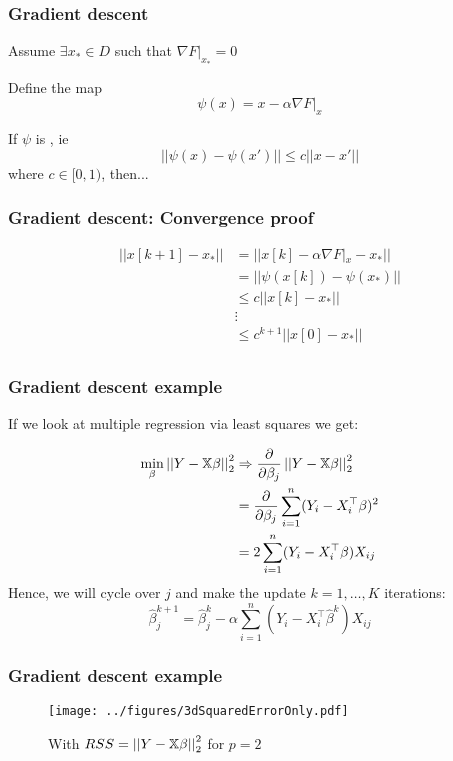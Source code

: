 \documentclass{beamer}
\begin{document}
\begin{frame}
\frametitle{Gradient descent}
Assume $\exists x_* \in D$ such that $\nabla F|_{x_*} = 0$

\vsp
Define the map
\[
\psi(x) = x - \alpha \nabla F|_{x} 
\]

\vsp

If $\psi$ is , ie
\[
||\psi(x) - \psi(x')|| \leq c ||x - x'||
\]
where $c \in [0,1)$, then...
\vsp


\end{frame}

\begin{frame}
\frametitle{Gradient descent: Convergence proof}
\begin{align}
||x[k+1] - x_*||  
& = 
||x[k] - \alpha \nabla F|_{x}   - x_*||  \\
& = || \psi(x[k]) - \psi(x_*) || \\
\label{eq:linear}
& \leq c ||x[k] - x_* || \\
& \vdots \\
& \leq c^{k+1} ||x[0] - x_* || \\
\end{align}

\vsp
{}

\end{frame}


\begin{frame}[fragile]
\frametitle{Gradient descent example}
If we look at multiple regression via least squares we get:

\begin{align*}
\min_\beta \left|\left| Y- \mathbb{X}\beta \right|\right|_2^2 
& 
\Rightarrow \frac{\partial}{\partial \beta_j} \left|\left| Y- \mathbb{X}\beta \right|\right|_2^2 \\
& =
\frac{\partial}{\partial \beta_j} \sum_{i=1}^n (Y_i - X_i^{\top}\beta)^2 \\
& =
2\sum_{i=1}^n (Y_i - X_i^{\top} \beta)X_{ij} 
\end{align*}
Hence, we will cycle over $j$ and make the update $k = 1, \ldots, K$ iterations:
\[ 
\hat\beta_j^{k+1} = \hat\beta_j^{k} - \alpha \sum_{i=1}^n (Y_i - X_i^{\top} \hat\beta^{k})X_{ij}
\]

\end{frame}
\begin{frame}[fragile]
\frametitle{Gradient descent example}

\begin{figure}[!h]
\texttt{[image: ../figures/3dSquaredErrorOnly.pdf]}
\caption*{With $RSS = \left|\left| Y - \mathbb{X}\beta \right|\right|_2^2$ for $p = 2$}
\end{figure}

\end{frame}
\end{document}
